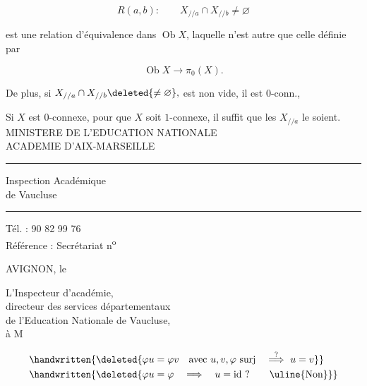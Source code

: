 \[
 R(a,b):\qquad X_{//a}\cap X_{//b}\ne\varnothing
\]

est une relation d'équivalence dans $\operatorname{Ob}X$, laquelle n'est autre que celle  définie par

\[
 \operatorname{Ob}X\longrightarrow\pi_0(X).
\]

De plus, si $X_{//a}\cap X_{//b}\deleted{\ne\varnothing},$ est non vide, il est $0$-conn.,  

Si $X$ est $0$-connexe,  pour que $X$ soit $1$-connexe, il suffit que les $X_{//a}$ le soient.
MINISTERE DE L'EDUCATION NATIONALE\\
ACADEMIE D'AIX-MARSEILLE\\
\rule{1cm}{0.3pt}

Inspection Académique\\
de Vaucluse\\
\rule{1cm}{0.3pt}

Tél. : 90 82 99 76\\
Référence : Secrétariat n\textsuperscript{o}

AVIGNON, le

L'Inspecteur d'académie,\\
directeur des services départementaux\\
de l'Education Nationale de Vaucluse,\\
à M

\[
\begin{aligned}
 &\handwritten{\deleted{\varphi u=\varphi v\quad\text{avec }u,v,\varphi\ \text{surj}\quad\overset{?}{\Longrightarrow}\ u=v}}\\
 &\handwritten{\deleted{\varphi u=\varphi\quad\Longrightarrow\quad u=\mathrm{id}\ ?\qquad\text{\uline{Non}}}}
\end{aligned}
\]

